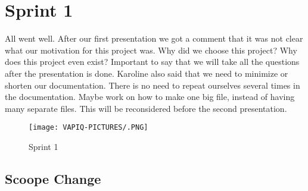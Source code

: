 
\section{Sprint 1}




\begin{comment}
This sprint has mostly been centered around providing the right documentation to HSN, as well as preparing
the first presentation. The documents produced are: Organizational Document containing project
plan and organization, Backlog And Traceability Document, Preliminary Test Plan And Specification,
Qualisys Document, Feasibility Study. The critical activity for the next week is to make a design, order
parts and components to build the first quadcoopter, allowing flight controller experiments to be performed
in KIC.
Some technical tasks have been postponed due to documentation and presentation 1. We assume that
we will be able to catch up this workload in sprint 2. Time estimation and time-logging has been a challenge.
But we intend to to a better job at this for the second sprint. For the second sprint all activities
performed will be in the Sprint Backlog with traceability
\end{comment}


All went well. After our first presentation we got a comment that it was not clear what our motivation for this project was. Why did we choose this project? Why does this project even exist? Important to say that we will take all the questions after the presentation is done. Karoline also said that we need to minimize or shorten our documentation. There is no need to repeat ourselves several times in the documentation. Maybe work on how to make one big file, instead of having many separate files. This will be reconsidered before the second presentation. 


\begin{figure} [H]
 \texttt{[image: VAPIQ-PICTURES/.PNG]}
 \caption{Sprint 1}
\end{figure}        

\subsection{Scoope Change}

\Subsection{}